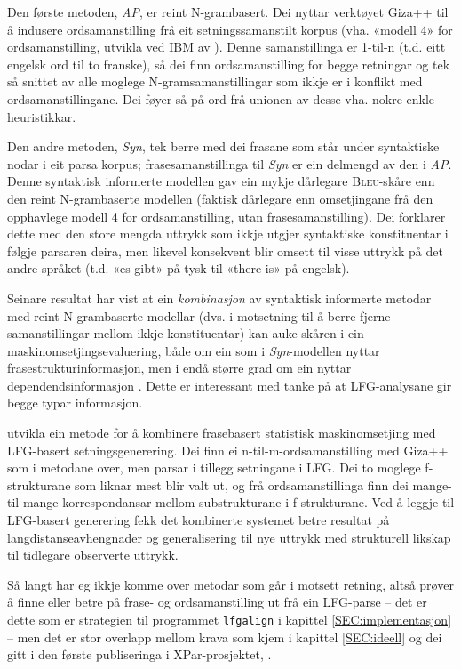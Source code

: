 \documentclass[11pt,a4paper,oneside,draft]{book}
\newcommand{\Bleu}{\textsc{Bleu}}
\begin{document}
Den første metoden, \emph{AP}, er reint N-grambasert. Dei nyttar verktøyet
Giza++ \citep[Och~og~Ney,~2000,~i][s.~50]{koehn2003spb} til å indusere
ordsamanstilling frå eit setningssamanstilt korpus (vha. «modell 4»
for ordsamanstilling, utvikla ved IBM av \citet{brown1993msm}). Denne
samanstillinga er 1-til-n (t.d. eitt engelsk ord til to franske), så
dei finn ordsamanstilling for begge retningar og tek så snittet av alle
moglege N-gramsamanstillingar som ikkje er i konflikt med
ordsamanstillingane. Dei føyer så på ord frå unionen av desse
vha. nokre enkle heuristikkar.

Den andre metoden, \emph{Syn}, tek berre med dei frasane som står under
syntaktiske nodar i eit parsa korpus; frasesamanstillinga til \emph{Syn} er
ein delmengd av den i \emph{AP}. Denne syntaktisk informerte modellen gav
ein mykje dårlegare \Bleu-skåre enn den reint N-grambaserte modellen
(faktisk dårlegare enn omsetjingane frå den opphavlege modell 4 for
ordsamanstilling, utan frasesamanstilling). Dei forklarer dette med
den store mengda uttrykk som ikkje utgjer syntaktiske konstituentar i
følgje parsaren deira, men likevel konsekvent blir omsett til visse
uttrykk på det andre språket (t.d. «es gibt» på tysk til «there is» på
engelsk).

Seinare resultat har vist at ein \emph{kombinasjon} av syntaktisk
informerte metodar med reint N-grambaserte modellar (dvs. i motsetning
til å berre fjerne samanstillingar mellom ikkje-konstituentar) kan
auke skåren i ein maskinomsetjingsevaluering, både om ein som i
\emph{Syn}-modellen nyttar frasestrukturinformasjon, men i endå større
grad om ein nyttar dependendsinformasjon
\citep{tinsley2007ept,hearne2008ccd}. Dette er interessant med tanke
på at LFG-analysane gir begge typar informasjon.

\citet{riezler2006gmt} utvikla ein metode for å kombinere frasebasert
statistisk maskinomsetjing med LFG-basert setningsgenerering. Dei finn
ei n-til-m-ordsamanstilling med Giza++ som i metodane over, men parsar
i tillegg setningane i LFG. Dei to moglege f-strukturane som liknar
mest blir valt ut, og frå ordsamanstillinga finn dei
mange-til-mange-korrespondansar mellom substrukturane i
f-strukturane. Ved å leggje til LFG-basert generering fekk det
kombinerte systemet betre resultat på langdistanseavhengnader og
generalisering til nye uttrykk med strukturell likskap til tidlegare
observerte uttrykk.

Så langt har eg ikkje komme over metodar som går i motsett retning,
altså prøver å finne eller betre på frase- og ordsamanstilling ut frå
ein LFG-parse -- det er dette som er strategien til programmet
\texttt{lfgalign} i kapittel \ref{SEC:implementasjon} -- men det er stor
overlapp mellom krava som kjem i kapittel \ref{SEC:ideell} og dei gitt
i den første publiseringa i XPar-prosjektet, \citet{dyvik2009lmp}.
\end{document}
